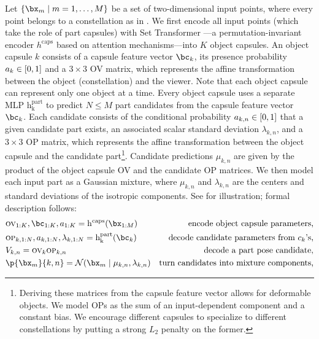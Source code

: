 Let $\set{\bx_m\mid m=1,\dots,M}$ be a set of two-dimensional input points, where every point belongs to a constellation as in .
We first encode all input points (which take the role of part capsules) with Set Transformer \citep{Lee2019set}---a permutation-invariant encoder $h^\mathrm{caps}$ based on attention mechanisms---into $K$ object capsules.
An object capsule $k$ consists of a capsule feature vector $\bc_k$, its presence probability $a_k \in {\left[0, 1\right]}$ and a $3 \times 3$ \gls{OV} matrix, which represents the affine transformation between the object (constellation) and the viewer.
Note that each object capsule can represent only one object at a time.
Every object capsule uses a separate \gls{MLP} $\operatorname{h_k^\mathrm{part}}$ to predict $N \leq M$ part candidates from the capsule feature vector $\bc_k$.
Each candidate consists of the conditional probability $a_{k,n} \in {\left[0, 1\right]}$ that a given candidate part exists, an associated scalar standard deviation $\lambda_{k,n}$, and a $3 \times 3$ \gls{OP} matrix, which represents the affine transformation between the object capsule and the candidate part\footnote{Deriving these matrices from the capsule feature vector allows for deformable objects. We model \gls{OP}s as the sum of an input-dependent component and a constant bias. We encourage different capsules to specialize to different constellations by putting a strong $L_2$ penalty on the former.}.
Candidate predictions $\mu_{k,n}$ are given by the product of the object capsule \gls{OV} and the candidate \gls{OP} matrices.
We then model each input part as a Gaussian mixture, where $\mu_{k,n}$ and $\lambda_{k,n}$ are the centers and standard deviations of the isotropic components.
See  for illustration; formal description follows:
\vspace*{-.5em}
\begin{align}
    &\textsc{ov}_{1:K}, \bc_{1:K}, a_{1:K} = \operatorname{h^\mathrm{caps}} (\bx_{1:M}) &\text{encode object capsule parameters,}\\
    &\textsc{op}_{k,1:N}, a_{k, 1:N}, \lambda_{k, 1:N} = \operatorname{h_k^\mathrm{part}} (\bc_k) &\text{decode candidate parameters from $c_k$'s,}\\
    &V_{k,n} = \textsc{ov}_k \textsc{op}_{k,n} &\text{decode a part pose candidate,}\\
    &\p{\bx_m}{k,n} = \gauss{\bx_m \mid \mu_{k,n}, \lambda_{k,n}} &\text{turn candidates into mixture components,}\label{eq:component}
\end{align}
